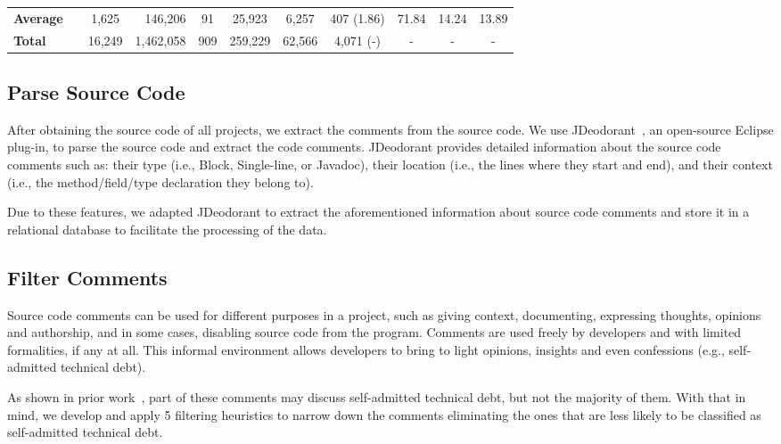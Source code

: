 \begin{landscape}
\begin{table}[thb!]
{\begin{tabular}{l| c c r c || c c c || c c c}
            \midrule 
            \textbf{Average}        &          &1,625  &146,206  &91   &25,923  & 6,257   & 407 (1.86)    &  71.84  & 14.24  & 13.89 \\ 
            \textbf{Total}          &          &16,249 &1,462,058&909  &259,229 & 62,566  & 4,071 (-)     &  -      & -      & -     \\   
            \bottomrule             
        \end{tabular}}
\end{table}
\end{landscape}

\subsection{Parse Source Code} 
\label{chap4:sub:parse_source_code}

After obtaining the source code of all projects, we extract the comments from the source code. We use JDeodorant~\cite{Tsantalis2008CSMR}, an open-source Eclipse plug-in, to parse the source code and extract the code comments. JDeodorant provides detailed information about the source code comments such as: their type (i.e., Block, Single-line, or Javadoc), their location (i.e., the lines where they start and end), and their context (i.e., the method/field/type declaration they belong to).  

Due to these features, we adapted JDeodorant to extract the aforementioned information about source code comments and store it in a relational database to facilitate the processing of the data. 

\subsection{Filter Comments} 
\label{chap4:sub:filter_comments}

Source code comments can be used for different purposes in a project, such as giving context, documenting, expressing thoughts, opinions and authorship, and in some cases, disabling source code from the program. Comments are used freely by developers and with limited formalities, if any at all. This informal environment allows developers to bring to light opinions, insights and even confessions (e.g., self-admitted technical debt). 

As shown in prior work~\cite{Maldonado2015MTD}, part of these comments may discuss self-admitted technical debt, but not the majority of them. With that in mind, we develop and apply 5 filtering heuristics to narrow down the comments eliminating the ones that are less likely to be classified as self-admitted technical debt.

